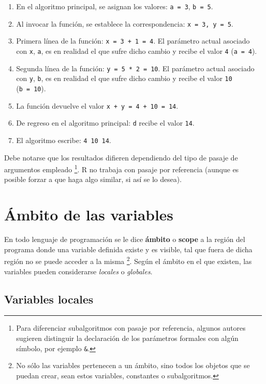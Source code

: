 \documentclass[
]{book}
\providecommand{\tightlist}{%
  \setlength{\itemsep}{0pt}\setlength{\parskip}{0pt}}
\begin{document}
\begin{enumerate}
\def\labelenumi{\arabic{enumi}.}
\tightlist
\item
  En el algoritmo principal, se asignan los valores: \texttt{a\ =\ 3}, \texttt{b\ =\ 5}.
\item
  Al invocar la función, se establece la correspondencia: \texttt{x\ =\ 3,\ y\ =\ 5}.
\item
  Primera línea de la función: \texttt{x\ =\ 3\ +\ 1\ =\ 4}. El parámetro actual asociado con \texttt{x}, \texttt{a}, es en realidad el que sufre dicho cambio y recibe el valor \texttt{4} (\texttt{a\ =\ 4}).
\item
  Segunda línea de la función: \texttt{y\ =\ 5\ *\ 2\ =\ 10}. El parámetro actual asociado con \texttt{y}, \texttt{b}, es en realidad el que sufre dicho cambio y recibe el valor \texttt{10} (\texttt{b\ =\ 10}).
\item
  La función devuelve el valor \texttt{x\ +\ y\ =\ 4\ +\ 10\ =\ 14}.
\item
  De regreso en el algoritmo principal: \texttt{d} recibe el valor \texttt{14}.
\item
  El algoritmo escribe: \texttt{4\ 10\ 14}.
\end{enumerate}

Debe notarse que los resultados difieren dependiendo del tipo de pasaje de argumentos empleado
\footnote{Para diferenciar subalgoritmos con pasaje por referencia, algunos autores sugieren distinguir la declaración de los parámetros formales con algún símbolo, por ejemplo \texttt{\&}.}. R no trabaja con pasaje por referencia (aunque es posible forzar a que haga algo similar, si así se lo desea).

\hypertarget{uxe1mbito-de-las-variables}{%
\section{Ámbito de las variables}\label{uxe1mbito-de-las-variables}}

En todo lenguaje de programación se le dice \textbf{ámbito} o \textbf{scope} a la región del programa donde una variable definida existe y es visible, tal que fuera de dicha región no se puede acceder a la misma
\footnote{No sólo las variables pertenecen a un ámbito, sino todos los objetos que se puedan crear, sean estos variables, constantes o subalgoritmos.}. Según el ámbito en el que existen, las variables pueden considerarse \emph{locales} o \emph{globales}.

\hypertarget{variables-locales}{%
\subsection{Variables locales}\label{variables-locales}}
\end{document}
